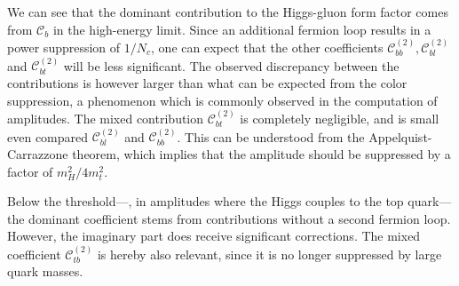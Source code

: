 We can see that the dominant contribution to the Higgs-gluon form factor comes from $\mathcal{C}_{b}$ in the high-energy limit. Since an additional fermion loop results in a power suppression of $1/N_c$, one can expect that the other coefficients $\mathcal{C}_{bb}^{(2)}, \mathcal{C}_{bl}^{(2)}$ and $\mathcal{C}_{bt}^{(2)}$ will be less significant. The observed discrepancy between the contributions is however larger than what can be expected from the color suppression, a phenomenon which is commonly observed in the computation of amplitudes. The mixed contribution $\mathcal{C}_{bt}^{(2)}$ is completely negligible, and is small even compared $\mathcal{C}_{bl}^{(2)}$ and $\mathcal{C}_{bb}^{(2)}$. This can be understood from the Appelquist-Carrazzone theorem, which implies that the amplitude should be suppressed by a factor of $m_H^2/4m_t^2$.

Below the threshold---\ie, in amplitudes where the Higgs couples to the top quark---the dominant coefficient stems from contributions without a second fermion loop. However, the imaginary part does receive significant corrections. The mixed coefficient $\mathcal{C}_{tb}^{(2)}$ is hereby also relevant, since it is no longer suppressed by large quark masses.

